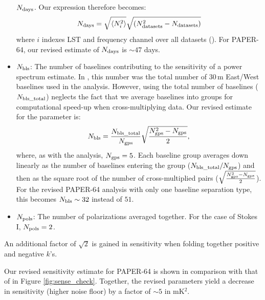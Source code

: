 \documentclass[preprint2,numberedappendix,tighten]{aastex6}
\begin{document}
\begin{itemize}
$N_{\rm days}$. Our expression therefore becomes:
\begin{equation}
N_{\rm days} = \sqrt{\langle N_{i}^{2}\rangle} \sqrt{(N_{\rm datasets}^{2}-N_{\rm datasets})}
 \end{equation}
\noindent where $i$ indexes LST and frequency channel over all datasets (\citealt{jacobs_et_al2015}). For PAPER-64, our revised estimate of $N_{\rm days}$ is $\sim47$ 
days.
\item $N_{\rm bls}$: The number of baselines contributing to the sensitivity of a power spectrum estimate. In , this number was 
the total number of $30$\,m East/West baselines used in the analysis. However, using the total number of baselines ($N_{\rm bls\_total}$) neglects 
the fact that we average baselines into groups for computational speed-up when cross-multiplying data. Our revised estimate for the parameter is:
\begin{equation}
N_{\rm bls} = \frac{N_{\rm bls\_total}}{N_{\rm gps}}\sqrt{\frac{N_{\rm gps}^{2}-N_{\rm gps}}{2}},
\end{equation}
\noindent where, as with the  analysis, $N_{\rm gps} = 5$. Each baseline group averages down linearly as the number of baselines 
entering the group ($N_{\rm bls\_total}/N_{\rm gps}$) and then as the square root of the number of cross-multiplied pairs \Big($\sqrt{\frac{N_{\rm gps}^{2} - 
N_{\rm gps}}{2}}$\Big). For the revised PAPER-64 analysis with only one baseline separation type, this becomes $N_{\rm bls} \sim 32$ instead 
of $51$. 
\item $N_{\rm pols}$: The number of polarizations averaged together. For the case of Stokes I, $N_{\rm pols}=2$.
\end{itemize}

An additional factor of $\sqrt{2}$ is gained in sensitivity when folding together positive and negative $k$'s. 

Our revised sensitivity estimate for PAPER-64 is shown in comparison with that of  in Figure \ref{fig:sense_check}. 
Together, the revised parameters yield a decrease in sensitivity (higher noise floor) by a factor of $\sim5$ in mK$^{2}$. 
\end{document}
